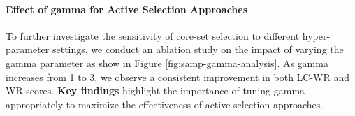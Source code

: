 \vspace{-0.1in}
\paragraph{Effect of gamma for Active Selection Approaches}
To further investigate the sensitivity of core-set selection to different hyper-parameter settings, we conduct an ablation study on the impact of varying the gamma parameter as show in Figure \ref{fig:samp-gamma-analysis}. As gamma increases from 1 to 3, we observe a consistent improvement in both LC-WR and WR scores. \textbf{Key findings} highlight the importance of tuning gamma appropriately to maximize the effectiveness of active-selection approaches.

